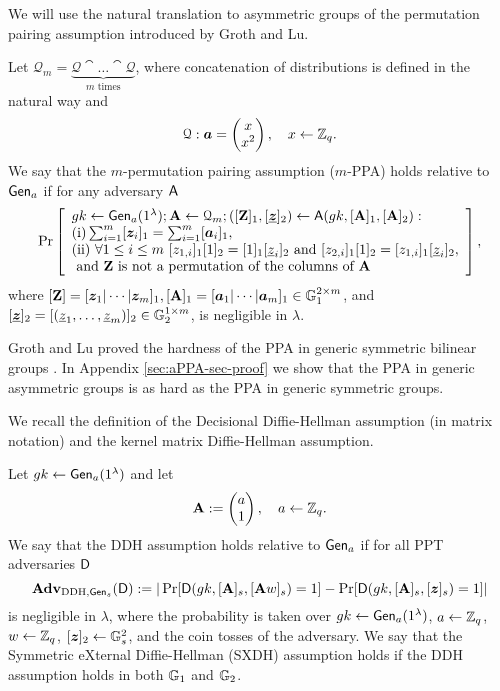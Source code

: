 
We will use the natural translation to asymmetric groups of the permutation pairing assumption introduced by Groth and Lu.
\begin{definition}\label{def:ppa}
Let $\mathcal{Q}_{m}=\underbrace{\mathcal{Q}\cat\ldots\cat\mathcal{Q}}_{m\text{ times}}$, where concatenation of  distributions is defined in the natural way and 
$$\mathcal{Q}: {\boldsymbol{a}}=\left(\begin{matrix}x\\x^2\end{matrix}\right),\quad x\gets\mathbb{Z}_q.$$
We say that the $m$-permutation pairing assumption ($m$-PPA) holds relative to $\mathsf{Gen}_a$ if for any adversary $\mathsf{A}$
$$
\Pr\left[
\begin{array}{l}
	gk\gets\G_a(1^\lambda);\matr{A}\gets\mathcal{Q}_{m};([\matr{Z}]_1,[\underline{\vecb{z}}]_2)\gets\advA(gk,[\matr{A}]_1,[\matr{A}]_2):\\
	\mathrm{(i)} \sum_{i=1}^{m}[\vecb{z}_i]_1 = \sum_{i=1}^{m}[\vecb{a}_i]_1,\\
	\mathrm{(ii)}\ \forall 1\leq i\leq m\ [z_{1,i}]_1[1]_2=[1]_1[\underline{z}_{i}]_2 \text{ and } [z_{2,i}]_1[1]_2=[z_{1,i}]_1[\underline{z}_{i}]_2,\\
	\text{ and }\matr{Z}\text{ is not a permutation of the columns of }\matr{A}
\end{array}
\right],
$$
where $[\mathbf{{Z}}]=[{\boldsymbol{z}}_1|\cdots|{\boldsymbol{z}}_m]_1, [\mathbf{{A}}]_1=[{\boldsymbol{a}}_1|\cdots|{\boldsymbol{a}}_m]_1\in\mathbb{G}_1^{2\times m}$, and $[\underline{{\boldsymbol{z}}}]_2=\allowbreak[(\underline{z}_1,\ldots,\allowbreak \underline{z}_m)]_2\in\mathbb{G}_2^{1\times m}$, is negligible in $\lambda$.
\end{definition}
Groth and Lu proved the hardness of the PPA in generic symmetric bilinear groups \cite{AC:GroLu07}. In Appendix \ref{sec:aPPA-sec-proof} we show that the PPA in generic asymmetric groups is as hard as the PPA in generic symmetric groups.

We recall the definition of the Decisional Diffie-Hellman assumption (in matrix notation) and the kernel matrix Diffie-Hellman assumption.

\begin{definition}\label{def:dlin}
 Let  ${gk} 
\gets \mathsf{Gen}_a(1^\lambda)$ and let
$$
\mathbf{{A}} :=
\begin{pmatrix} 
a     \\
1
\end{pmatrix},
\quad
a\gets\mathbb{Z}_q.
$$
We say that the DDH assumption holds relative to $\mathsf{Gen}_a$ if for all PPT adversaries $\mathsf{D}$
$$
\mathbf{Adv}_{\mathrm{DDH},\mathsf{Gen}_s}(\mathsf{D}) := |
	\Pr[
		\mathsf{D}(
			gk,
			[\mathbf{{A}}]_s,
			[\mathbf{{A}}{w}]_s)=1]
	-\Pr[
		\mathsf{D}(
		gk,
		[\mathbf{{A}}]_s,
		[{\boldsymbol{z}}]_s)=1]|
$$
is negligible in $\lambda$, where the probability is taken over $gk\gets\mathsf{Gen}_a(1^\lambda)$, $a\gets\mathbb{Z}_q$, ${w}\gets\mathbb{Z}_q$, $[{\boldsymbol{z}}]_2\gets\mathbb{G}^2_s$, and the coin tosses of the adversary.
We say that the Symmetric eXternal Diffie-Hellman (SXDH) assumption holds if the DDH assumption holds in both $\mathbb{G}_1$ and $\mathbb{G}_2$.
\end{definition}

